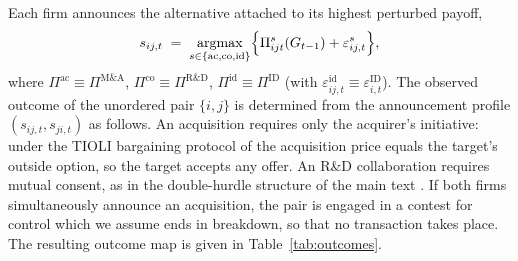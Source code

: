 Each firm announces the alternative attached to its
highest perturbed payoff,
\begin{equation}
  s_{ij,t} \;=\; \operatorname*{argmax}_{s \in \{\mathrm{ac}, \mathrm{co},
  \mathrm{id}\}}
  \Bigl\{ \Pi^{s}_{ijt}(G_{t-1}) + \varepsilon^{s}_{ij,t} \Bigr\},
  \label{eq:app:sincere}
\end{equation}
where $\Pi^{\mathrm{ac}} \equiv \Pi^{\mathrm{M\&A}}$,
$\Pi^{\mathrm{co}} \equiv \Pi^{\mathrm{R\&D}}$,
$\Pi^{\mathrm{id}} \equiv \Pi^{\mathrm{ID}}$ (with
$\varepsilon^{\mathrm{id}}_{ij,t} \equiv
\varepsilon^{\mathrm{ID}}_{i,t}$). 
The observed outcome of the unordered pair $\{i,j\}$ is determined from
the announcement profile $(s_{ij,t}, s_{ji,t})$ as follows. An
acquisition requires only the acquirer's initiative: under the TIOLI
bargaining protocol of \citet{igami2020mergers} the acquisition price
equals the target's outside option, so the target accepts any offer. An
R\&D collaboration requires mutual consent, as in the double-hurdle
structure of the main text \citep{Poirier1980,Comola2012}. If both
firms simultaneously announce an acquisition, the pair is engaged in a
contest for control which we assume ends in breakdown, so that no
transaction takes place. The resulting outcome map is given in
Table~\ref{tab:outcomes}.
